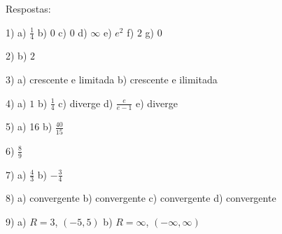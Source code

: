 \documentclass{article}
\begin{document}
Respostas:

1) a) $\frac{1}{4}$ b) $0$ c) $0$ d) $\infty$ e) $e^2$ f) $2$ g) $0$

2) b) $2$

3) a) crescente e limitada b) crescente e ilimitada

4) a) $1$ b) $\frac{1}{4}$ c) diverge d) $\frac{e}{e-1}$ e) diverge

5) a) 16 b) $\frac{40}{15}$

6) $\frac{8}{9}$

7) a) $\frac{4}{3}$ b) $-\frac{3}{4}$

8) a) convergente b) convergente c) convergente d) convergente

9) a) $R=3$, $(-5, 5)$ b) $R=\infty$, $(-\infty, \infty)$
\end{document}
